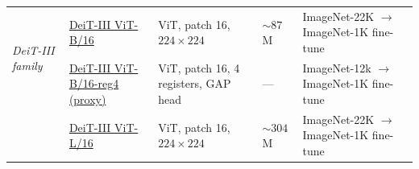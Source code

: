 \begin{table}[H]
\begin{center}
{\begin{tabular}{lllll}
\multirow{2}{10em}{\textit{DeiT-III family}} & \href{https://huggingface.co/timm/deit3_base_patch16_224.fb_in22k_ft_in1k}{DeiT-III ViT-B/16} &
  ViT, patch 16, $224{\times}224$ &
  ${\sim}87$M &
  ImageNet-22K $\to$ ImageNet-1K fine-tune \\
& \href{https://huggingface.co/timm/vit_base_patch16_reg4_gap_256.sbb_in12k_ft_in1k}{DeiT-III ViT-B/16-reg4 (proxy)} &
  ViT, patch 16, 4 registers, GAP head &
  --- &
  ImageNet-12k $\to$ ImageNet-1K fine-tune \\
& \href{https://huggingface.co/timm/deit3_large_patch16_224.fb_in22k_ft_in1k}{DeiT-III ViT-L/16} &
  ViT, patch 16, $224{\times}224$ &
  ${\sim}304$M &
  ImageNet-22K $\to$ ImageNet-1K fine-tune \\
\bottomrule
\end{tabular}%
}
\end{center}
\vspace{4pt}
\end{table}

